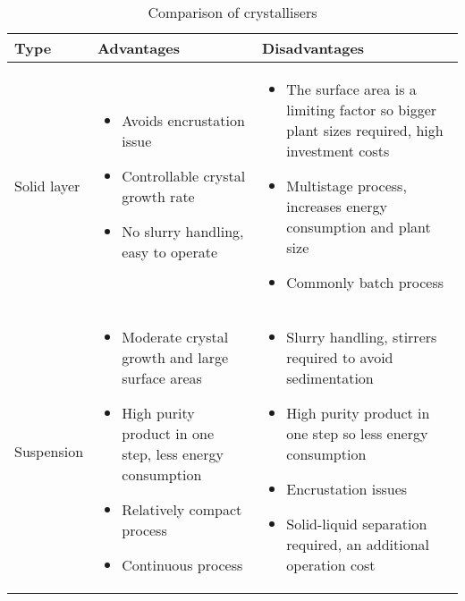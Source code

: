 \begin{table}
\caption{Comparison of crystallisers \cite{myerson_handbook_2019} }
\label{tab:crystallisertype}
\begin{tabularx}{\linewidth}{lXX}
\toprule
Type & Advantages                 & Disadvantages                               \\ \midrule
Solid layer & \begin{itemize}[label=+,leftmargin=1em]
  \item Avoids encrustation issue 
  \item Controllable crystal growth rate 
  \item No slurry handling, easy to operate
\end{itemize} & \begin{itemize}[label=-,leftmargin=1em]
  \item The surface area is a limiting factor so bigger plant sizes required, high investment costs
  \item Multistage process, increases energy consumption and plant size 
  \item Commonly batch process
\end{itemize} \\\midrule 
Suspension &  \begin{itemize}[label=+,leftmargin=1em]
  \item Moderate crystal growth and large surface areas 
  \item High purity product in one step, less energy consumption
  \item Relatively compact process
  \item Continuous process
\end{itemize} & \begin{itemize}[label=-,leftmargin=1em]
  \item Slurry handling, stirrers required to avoid sedimentation
  \item High purity product in one step so less energy consumption
  \item Encrustation issues 
  \item Solid-liquid separation required, an additional operation cost
\end{itemize}
\\\bottomrule
\end{tabularx}
\end{table}

